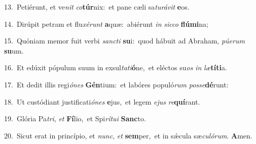 {\numbfont\textcolor{\numbcolor}{13.}}~Petiérunt, et ve\textit{nit} \textit{co}\-\textbf{túr}nix:~\star et pane cæli sa\-\textit{tu}\-\textit{rá}\textit{vit} \textbf{e}\-os.\par
{\numbfont\textcolor{\numbcolor}{14.}}~Dirúpit petram et flu\-\textit{xé}\-\textit{runt} \textbf{a}\-quæ:~\star abiérunt \textit{in} \textit{sic}\-\textit{co} \textbf{flú}\-\textbf{mi}na;\par
{\numbfont\textcolor{\numbcolor}{15.}}~Quóniam memor fuit verbi \textit{sanc}\-\textit{ti} \textbf{su}\-i:~\star quod hábuit ad Abraham, \textit{pú}\-\textit{e}\textit{rum} \textbf{su}\-um.\par
{\numbfont\textcolor{\numbcolor}{16.}}~Et edúxit pópulum suum in exsul\-\textit{ta}\-\textit{ti}\textbf{ó}ne,~\star et eléctos su\textit{os} \textit{in} \textit{læ}\-\textbf{tí}\textbf{ti}a.\par
{\numbfont\textcolor{\numbcolor}{17.}}~Et dedit illis regi\-\textit{ó}\-\textit{nes} \textbf{Gén}\-tium:~\star et labóres populó\textit{rum} \textit{pos}\-\textit{se}\textbf{dé}runt:\par
{\numbfont\textcolor{\numbcolor}{18.}}~Ut custódiant justificati\-\textit{ó}\-\textit{nes} \textbf{e}\-jus,~\star et legem \textit{e}\-\textit{jus} \textit{re}\-\textbf{quí}rant.\par
{\numbfont\textcolor{\numbcolor}{19.}}~Glória Pa\-\textit{tri}\-, \textit{et} \textbf{Fí}\-lio,~\star et Spi\-\textit{rí}\-\textit{tu}\textit{i} \textbf{Sanc}\-to.\par
{\numbfont\textcolor{\numbcolor}{20.}}~Sicut erat in princípio, et \textit{nunc}\-, \textit{et} \textbf{sem}\-per,~\star et in sǽcula sæ\-\textit{cu}\-\textit{ló}\textit{rum}. \textbf{A}\-men.\par
